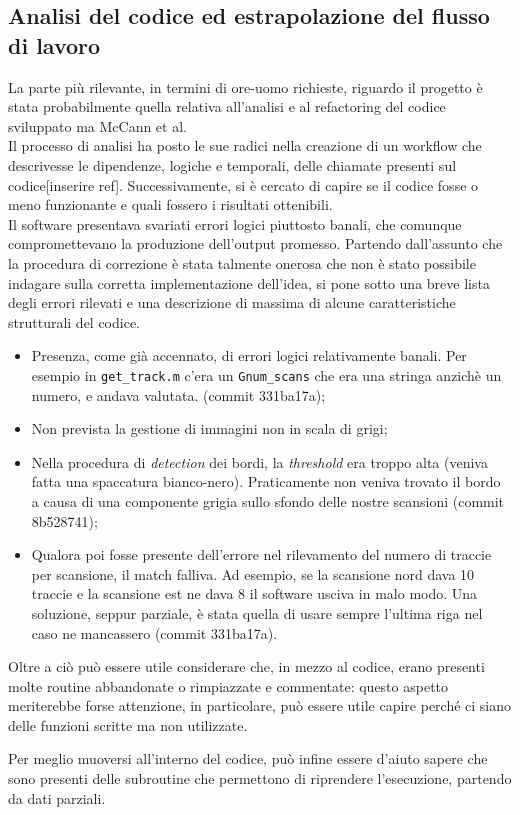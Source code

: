 \subsection{Analisi del codice ed estrapolazione del flusso di lavoro}
La parte più rilevante, in termini di ore-uomo richieste, riguardo il
progetto è stata probabilmente quella relativa all'analisi e al refactoring
del codice sviluppato ma McCann et al. \\
Il processo di analisi ha posto le sue radici nella creazione di un 
workflow che descrivesse le dipendenze, logiche e temporali, delle chiamate
presenti sul codice[inserire ref]. Successivamente, si è cercato di capire 
se il codice fosse o meno funzionante e quali fossero i risultati 
ottenibili. \\
Il software presentava svariati errori logici piuttosto banali, che 
comunque compromettevano la produzione dell'output promesso. Partendo
dall'assunto che la procedura di correzione è stata talmente
onerosa che non è stato possibile indagare sulla corretta implementazione
dell'idea, si pone sotto una breve lista degli errori rilevati e una 
descrizione di massima di alcune caratteristiche strutturali del codice.

\begin{itemize}
\item Presenza, come già accennato, di errori logici relativamente banali. 
Per esempio in \texttt{get\_track.m} c'era un \texttt{Gnum\_scans} che era 
una stringa anzichè un numero, e andava valutata. (commit 331ba17a);
\item Non prevista la gestione di immagini non in scala di grigi;
\item Nella procedura di \emph{detection} dei bordi, la
\emph{threshold} era troppo alta (veniva fatta una spaccatura bianco-nero). 
Praticamente non veniva trovato il bordo a causa di una componente
grigia sullo sfondo delle nostre scansioni (commit 8b528741);
\item Qualora poi fosse presente dell'errore nel rilevamento del numero 
di traccie 
per scansione, il match falliva. Ad esempio, se la scansione nord 
dava 10 traccie e la scansione est ne dava 8 il software usciva in malo
modo. Una soluzione, seppur parziale, è stata quella di usare 
sempre l'ultima riga nel caso ne mancassero (commit 331ba17a).
\end{itemize}

Oltre a ciò può essere utile considerare che, in mezzo al codice, erano
presenti molte routine abbandonate o rimpiazzate e commentate: questo 
aspetto meriterebbe forse attenzione, in particolare, può essere utile
capire perché ci siano delle funzioni scritte ma non utilizzate.

Per meglio muoversi all'interno del codice, può infine essere d'aiuto
sapere che sono presenti delle subroutine che permettono di riprendere 
l'esecuzione, partendo da dati parziali.
